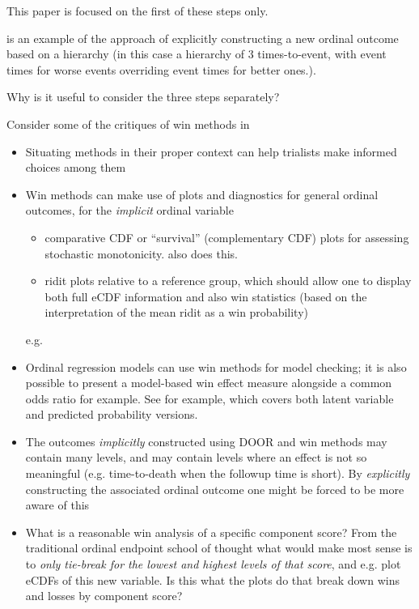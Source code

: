 \documentclass[
  11pt,
  fleqn
]{article}
\begin{document}
This paper is focused on the first of these steps only.

\citet{follmannAnalysisOrderedComposite2020} is an example of the
approach of explicitly constructing a new ordinal outcome based on a
hierarchy (in this case a hierarchy of 3 times-to-event, with event
times for worse events overriding event times for better ones.).

Why is it useful to consider the three steps separately?

Consider some of the critiques of win methods in
\citet[e.g.~][]{ajufoFallaciesUsingWin2023}

\begin{itemize}
  \item Situating methods in their proper context can help
    trialists make informed choices among them
  \item Win methods can make use of
    plots and diagnostics for general ordinal outcomes, for the
    \emph{implicit}
    ordinal variable
    \begin{itemize}
      \item comparative CDF or ``survival''
        (complementary CDF) plots for assessing stochastic
        monotonicity. \citet{follmannAnalysisOrderedComposite2020}
        also does this.
      \item ridit plots
        \citep{brossHowUseRidit1958,jansenRiditAnalysisReview1984}
        relative to a
        reference group, which should allow one to display both full
        eCDF information
        and also win statistics (based on the interpretation of the
          mean ridit as a win
        probability)
    \end{itemize}e.g.
  \item Ordinal regression models can use win
    methods for model checking; it is also possible to present a
    model-based win
    effect measure alongside a common odds ratio for example. See
    \citep{agrestiOrdinalProbabilityEffect2017} for example,
    which covers both
    latent variable and predicted probability versions.
  \item The outcomes
    \emph{implicitly} constructed using DOOR and win methods may
    contain many
    levels, and may contain levels where an effect is not so
    meaningful (e.g.
    time-to-death when the followup time is short). By \emph{explicitly}
    constructing the associated ordinal outcome one might be
    forced to be more
    aware of this
  \item What is a reasonable win analysis of a specific component
    score? From the traditional ordinal endpoint school of thought
    what would make
    most sense is to \emph{only tie-break for the lowest and highest
      levels of that
    score}, and e.g. plot eCDFs of this new variable. Is this
    what the plots do
    that break down wins and losses by component score?
\end{itemize}
\end{document}
